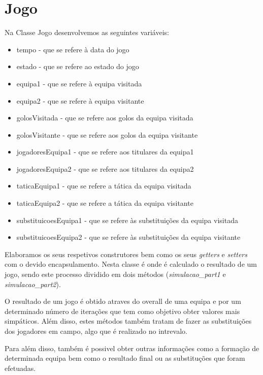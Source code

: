 \documentclass[a4paper,12pt]{article}
\begin{document}
\section{Jogo}
    Na Classe Jogo desenvolvemos as seguintes variáveis:
    \begin{itemize}
        \item tempo - que se refere à data do jogo
        \item estado - que se refere ao estado do jogo
        \item equipa1 - que se refere à equipa visitada
        \item equipa2 - que se refere à equipa visitante
        \item golosVisitada - que se refere aos golos da equipa visitada
        \item golosVisitante - que se refere aos golos da equipa visitante
        \item jogadoresEquipa1 - que se refere aos titulares da equipa1
        \item jogadoresEquipa2 - que se refere aos titulares da equipa2
        \item taticaEquipa1 - que se refere a tática da equipa visitada
        \item taticaEquipa2 - que se refere a tática da equipa visitante
        \item substituicoesEquipa1 - que se refere às substituições da equipa visitada
        \item substituicoesEquipa2 - que se refere às substituições da equipa visitante
    \end{itemize} \par
    Elaboramos os seus respetivos construtores bem como os seus \emph{getters} e \emph{setters} com o devido encapsulamento.
    Nesta classe é onde é calculado o resultado de um jogo, sendo este processo dividido em dois métodos
(\emph{simulacao\_part1} e \emph{simulacao\_part2}).\par
    O resultado de um jogo é obtido atraves do overall de uma equipa e por um determinado número de iterações que tem
como objetivo obter valores mais simpáticos. Além disso, estes métodos também tratam de fazer as substituições dos
jogadores em campo, algo que é realizado no intrevalo. \par
    Para além disso, também é possivel obter outras informações como a formação de determinada equipa bem como o resultado
final ou as substituções que foram efetuadas.
\end{document}
